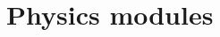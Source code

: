 \documentclass[draftmode,draftwater]{memarticle}
\begin{document}



\section{Physics modules}
\end{document}
